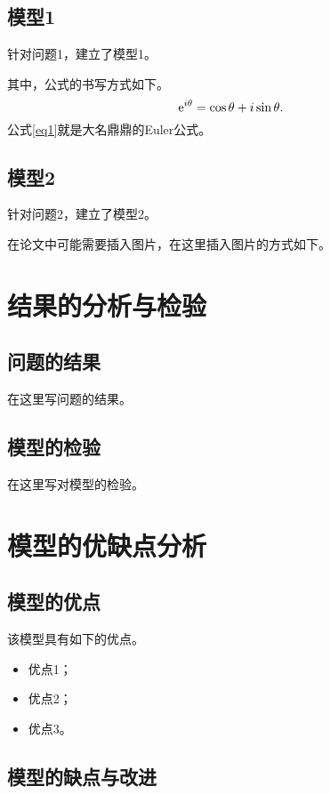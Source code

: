 \documentclass[12pt, a4paper, oneside]{ctexart}
\begin{document}
\subsection{模型1}

针对问题1，建立了模型1。

其中，公式的书写方式如下。
\begin{equation}
    \label{eq1}
    {\rm{e}}^{i\theta}=\cos\theta+i\sin\theta.
\end{equation}
公式\ref{eq1}就是大名鼎鼎的Euler公式。

\subsection{模型2}

针对问题2，建立了模型2。

在论文中可能需要插入图片，在这里插入图片的方式如下。

\section{结果的分析与检验}

\subsection{问题的结果}

在这里写问题的结果。

\subsection{模型的检验}

在这里写对模型的检验。

\section{模型的优缺点分析}

\subsection{模型的优点}

该模型具有如下的优点。
\begin{itemize}
    \item 优点1；
    \item 优点2；
    \item 优点3。
\end{itemize}

\subsection{模型的缺点与改进}
\end{document}
